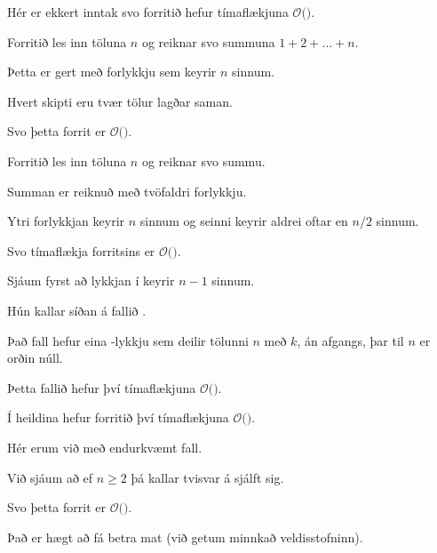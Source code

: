 {
	{
		\item<2-> Hér er ekkert inntak svo forritið hefur tímaflækjuna $\mathcal{O}($\onslide<all:2->{$\,1\,$}$)$.
	}
}

{
	{
		\item<2-> Forritið les inn töluna $n$ og reiknar svo summuna $1 + 2 + \dots + n$.
		\item<3-> Þetta er gert með forlykkju sem keyrir $n$ sinnum.
		\item<4-> Hvert skipti eru tvær tölur lagðar saman.
		\item<5-> Svo þetta forrit er $\mathcal{O}($\onslide<6- | handout:2->{$\,n\,$}$)$.
	}
}

{
	{
		\item<2-> Forritið les inn töluna $n$ og reiknar svo summu.
		\item<3-> Summan er reiknuð með tvöfaldri forlykkju.
		\item<4-> Ytri forlykkjan keyrir $n$ sinnum og seinni keyrir aldrei oftar en $n/2$ sinnum.
		\item<5-> Svo tímaflækja forritsins er $\mathcal{O}($\onslide<6- | handout:2->{$n^2$}$)$.
	}
}

{
	{
		\item<2-> Sjáum fyrst að lykkjan í  keyrir $n - 1$ sinnum.
		\item<3-> Hún kallar síðan á fallið .
		\item<4-> Það fall hefur eina -lykkju sem deilir tölunni $n$ með $k$, án afgangs, þar til $n$ er orðin núll.
		\item<5-> Þetta fallið  hefur því tímaflækjuna $\mathcal{O}($\onslide<6- | handout:2->{$\log n$}$)$.
		\item<7-> Í heildina hefur forritið því tímaflækjuna $\mathcal{O}($\onslide<8- | handout:3->{$n \log n$}$)$.
	}
}

{
	{
		\item<2-> Hér erum við með endurkvæmt fall.
		\item<3-> Við sjáum að ef $n \geq 2$ þá kallar  tvisvar á sjálft sig.
		\item<4-> Svo þetta forrit er $\mathcal{O}($\onslide<5- | handout:2->{$2^n$}$)$.
		\item<6-> Það er hægt að fá betra mat (við getum minnkað veldisstofninn).
	}
}

